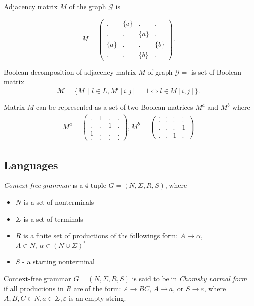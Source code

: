 Adjacency matrix $M$ of the graph $\mathcal{G}$ is

$$
    M =
    \begin{pmatrix}
    . & \{a\} & . & .     \\
    . & . & \{a\} & .     \\
    \{a\} & . & . & \{b\} \\
    . & . & \{b\} & .
    \end{pmatrix}.
$$

\begin{definition}

Boolean decomposition of adjacency matrix $M$ of graph $\mathcal{G}=$ is set of Boolean matrix $$\mathcal{M} = \{M^l \mid l \in L, M^l[i,j]=1 \iff l \in M[i,j]\}.$$

\end{definition}

Matrix $M$ can be represented as a set of two Boolean matrices $M^a$ and $M^b$ where
\begin{align}
M^{a} =
\begin{pmatrix}
    . & 1 & . & .   \\
    . & . & 1 & .   \\
    1 & . & . & .   \\
    . & . & . & .  
\end{pmatrix}, 
M^{b} =
\begin{pmatrix}      
    . & . & . & .   \\
    . & . & . & .   \\
    . & . & . & 1   \\
    . & . & 1 & . 
\end{pmatrix} \label{eq:boolean_decomposition_of_graph}
\end{align}
\subsection{Languages}
\begin{definition}\emph{Context-free grammar} is a 4-tuple $G=(N, \Sigma, R, S)$, where 
\begin{itemize}
    \item $N$ is a set of nonterminals
    \item $\Sigma$ is a set of terminals
    \item $R$ is a finite set of productions of the followings form: $A \to \alpha$, $A \in N,~ \alpha \in (N \cup \Sigma)^*$
    \item $S$ - a starting nonterminal
\end{itemize}
\end{definition}
\begin{definition} Context-free grammar $G = (N, \Sigma, R, S)$ is said to be in \emph{Chomsky normal form} if all productions in $R$ are of the form: $A \rightarrow BC$, $A \rightarrow a$, or $S \rightarrow \varepsilon$, where $A, B, C \in N, a \in \Sigma, \varepsilon$ is an empty string.
\end{definition}

